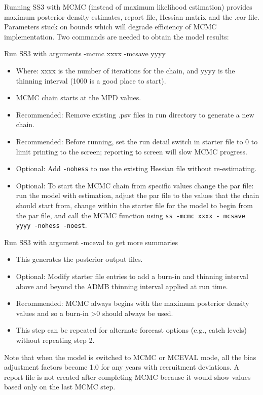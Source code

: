  Running SS3 with MCMC (instead of maximum likelihood estimation) provides maximum posterior density estimates, report file, Hessian matrix and the .cor file. Parameters stuck on bounds which will degrade efficiency of MCMC implementation. Two commands are needed to obtain the model results:
 
\noindent Run SS3 with arguments -mcmc xxxx -mcsave yyyy
 \begin{itemize}
 	\item Where: xxxx is the number of iterations for the chain, and yyyy is the thinning interval (1000 is a good place to start).
 	\item MCMC chain starts at the MPD values.
 	\item Recommended: Remove existing .psv files in run directory to generate a new chain.
 	\item Recommended: Before running, set the run detail switch in starter file to 0 to limit printing to the screen; reporting to screen will slow MCMC progress.
 	\item Optional: Add \texttt{-nohess} to use the existing Hessian file without re-estimating.
 	\item Optional: To start the MCMC chain from specific values change the par file: run the model with estimation, adjust the par file to the values that the chain should start from, change within the starter file for the model to begin from the par file, and call the MCMC function using \texttt{ss -mcmc xxxx - mcsave yyyy -nohess -noest}.
 \end{itemize}
	
\noindent Run SS3 with argument -mceval to get more summaries
\begin{itemize}
	\item This generates the posterior output files.
	\item Optional: Modify starter file entries to add a burn-in and thinning interval above and beyond the ADMB thinning interval applied at run time.
	\item Recommended: MCMC always begins with the maximum posterior density values and so a burn-in >0 should always be used.
	\item This step can be repeated for alternate forecast options (e.g., catch levels) without repeating step 2.
\end{itemize}

Note that when the model is switched to MCMC or MCEVAL mode, all the bias adjustment factors become 1.0 for any years with recruitment deviations. A report file is not created after completing MCMC because it would show values based only on the last MCMC step.

\pagebreak
